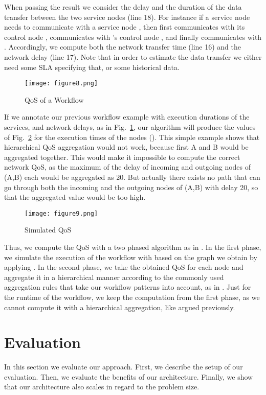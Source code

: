 \documentclass[10pt, conference, compsocconf]{IEEEtran}
\newcommand{\oneHalfImages}{2.12in}
\begin{document}
\noindent When passing the result we consider the delay and the duration of the data transfer between the two service nodes (line 18).
For instance if a service node  needs to communicate with a service node ,
	then first  communicates with its control node ,
		 communicates with 's control node ,
			and finally  communicates with .
Accordingly, we compute both the network transfer time (line 16) and the network delay (line 17).
Note that in order to estimate the data transfer we either need some SLA specifying that, or some historical data.

\begin{figure}[htb!]
	\centering
	\texttt{[image: figure8.png]}
	\caption{QoS of a Workflow}
	\label{fig:workflow_qos}
\end{figure}

If we annotate our previous workflow example with execution durations of the services,
	and network delays, as in Fig.~\ref{fig:workflow_qos},
		our algorithm will produce the values of Fig.~\ref{fig:workflow_qos_times} for the execution times of the nodes ().
This simple example shows that hierarchical QoS aggregation would not work,
	because first A and B would be aggregated together.
This would make it impossible to compute the correct network QoS,
	as the maximum of the delay of incoming and outgoing nodes of (A,B) each would be aggregated as 20.
But actually there exists no path that can go through both the incoming and the outgoing nodes of (A,B) with delay 20,
	so that the aggregated value would be too high.
	
\begin{figure}[htb!]
	\centering
  \texttt{[image: figure9.png]}
	\caption{Simulated QoS}
	\label{fig:workflow_qos_times}
\end{figure}

\noindent Thus, we compute the QoS with a two phased algorithm as in \cite{Klein2012}.
In the first phase, we simulate the execution of the workflow with 
	based on the graph we obtain by applying .
In the second phase, we take the obtained QoS for each node and aggregate it in a hierarchical manner
	according to the commonly used aggregation rules that take our workflow patterns into account, as in \cite{Jaeger2004,Yu2007}.
Just for the runtime of the workflow, we keep the computation from the first phase,
	as we cannot compute it with a hierarchical aggregation, like argued previously.

\section{Evaluation}
\label{evaluation}
\noindent In this section we evaluate our approach.
First, we describe the setup of our evaluation.
Then,	we evaluate the benefits of our architecture.
Finally, we show that our architecture also scales in regard to the problem size.
\end{document}

